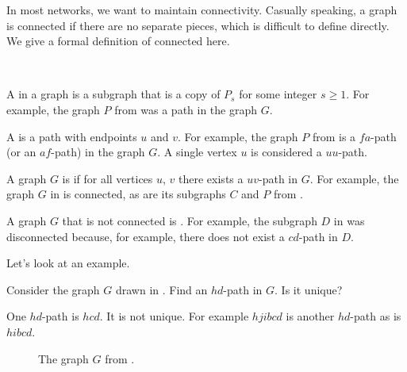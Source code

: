 In most networks, we want to maintain connectivity.  Casually speaking, a graph is connected if there are no separate pieces, which is difficult to define directly.  We give a formal definition of connected here.

\begin{defn}
\label{defn_path_connected}
~
    \begin{apart}
        \item A  in a graph is a subgraph that is a copy of $P_s$ for some integer $s \ge 1$.  For example, the graph $P$ from  was a path in the graph $G$. 
        
        \item A  is a path with endpoints $u$ and $v$.  For example, the graph $P$ from  is a $fa$-path (or an $af$-path) in the graph $G$. 
        A single vertex $u$ is considered a $uu$-path. 
        
        \item A graph $G$ is  if for all vertices $u$, $v$ there exists a $uv$-path in $G$.  For example, the graph $G$ in  is connected, as are its subgraphs $C$ and $P$ from .

        \item A graph $G$ that is not connected is .  For example, the subgraph $D$ in  was disconnected because, for example, there does not exist a $cd$-path in $D$.
    \end{apart}
\end{defn}

Let's look at an example.

\begin{exam}
\label{exam_finding paths}
    Consider the graph $G$ drawn in .  
    Find an $hd$-path in $G$.  Is it unique?
        \begin{soln}
            One $hd$-path is $hcd$.  It is not unique.  For example $hjibcd$ is another $hd$-path as is $hibcd$.
        \end{soln}
\end{exam}

        \begin{figure}[hbtp]
            \centering
            
            \caption{The graph $G$ from .}
            \label{fig_house_with_tails}
        \end{figure}

